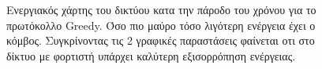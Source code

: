 \begin{figure}[H]
  \centering
  \caption{Ενεργιακός χάρτης του δικτύου κατα την πάροδο του χρόνου για το πρωτόκολλο Greedy. Όσο πιο μαύρο τόσο λιγότερη ενέργεια έχει ο κόμβος. Συγκρίνοντας τις 2
γραφικές παραστάσεις φαίνεται οτι στο δίκτυο με φορτιστή υπάρχει καλύτερη εξισορρόπηση ενέργειας.}
  \label{fig:1exp_4_1}
\end{figure}

